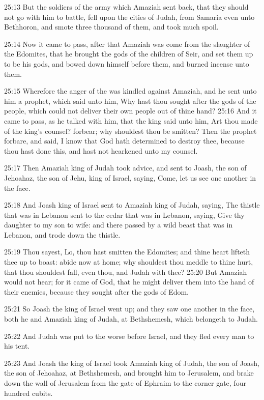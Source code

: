 25:13 But the soldiers of the army which Amaziah sent back, that they should not go with him to battle, fell upon the cities of Judah, from Samaria even unto Bethhoron, and smote three thousand of them, and took much spoil.

25:14 Now it came to pass, after that Amaziah was come from the slaughter of the Edomites, that he brought the gods of the children of Seir, and set them up to be his gods, and bowed down himself before them, and burned incense unto them.

25:15 Wherefore the anger of the \LORD was kindled against Amaziah, and he sent unto him a prophet, which said unto him, Why hast thou sought after the gods of the people, which could not deliver their own people out of thine hand?  25:16 And it came to pass, as he talked with him, that the king said unto him, Art thou made of the king's counsel?  forbear; why shouldest thou be smitten? Then the prophet forbare, and said, I know that God hath determined to destroy thee, because thou hast done this, and hast not hearkened unto my counsel.

25:17 Then Amaziah king of Judah took advice, and sent to Joash, the son of Jehoahaz, the son of Jehu, king of Israel, saying, Come, let us see one another in the face.

25:18 And Joash king of Israel sent to Amaziah king of Judah, saying, The thistle that was in Lebanon sent to the cedar that was in Lebanon, saying, Give thy daughter to my son to wife: and there passed by a wild beast that was in Lebanon, and trode down the thistle.

25:19 Thou sayest, Lo, thou hast smitten the Edomites; and thine heart lifteth thee up to boast: abide now at home; why shouldest thou meddle to thine hurt, that thou shouldest fall, even thou, and Judah with thee?  25:20 But Amaziah would not hear; for it came of God, that he might deliver them into the hand of their enemies, because they sought after the gods of Edom.

25:21 So Joash the king of Israel went up; and they saw one another in the face, both he and Amaziah king of Judah, at Bethshemesh, which belongeth to Judah.

25:22 And Judah was put to the worse before Israel, and they fled every man to his tent.

25:23 And Joash the king of Israel took Amaziah king of Judah, the son of Joash, the son of Jehoahaz, at Bethshemesh, and brought him to Jerusalem, and brake down the wall of Jerusalem from the gate of Ephraim to the corner gate, four hundred cubits.


